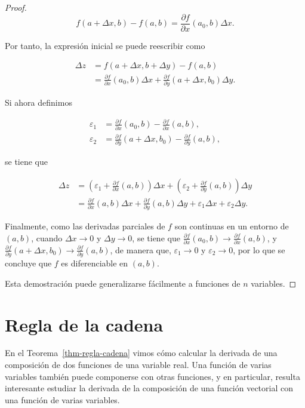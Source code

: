 \documentclass[
  a4paper,
]{scrreport}
\theoremstyle{plain}
\theoremstyle{definition}
\theoremstyle{plain}
\theoremstyle{plain}
\theoremstyle{definition}
\theoremstyle{definition}
\theoremstyle{remark}
\begin{document}
\begin{tcolorbox}
\begin{proof}
\[
f(a+\Delta x, b) - f(a,b) = \frac{\partial f}{\partial x}(a_0, b) \Delta x.
\]

Por tanto, la expresión inicial se puede reescribir como

\begin{align*}
\Delta z 
&= f(a+\Delta x, b+\Delta y) - f(a,b) \\
&= \frac{\partial f}{\partial x}(a_0, b) \Delta x + \frac{\partial f}{\partial y}(a+\Delta x, b_0) \Delta y.
\end{align*}

Si ahora definimos

\begin{align*}
\varepsilon_1 &= \frac{\partial f}{\partial x}(a_0,b)-\frac{\partial f}{\partial x}(a,b),\\
\varepsilon_2 &= \frac{\partial f}{\partial y}(a+\Delta x, b_0)-\frac{\partial f}{\partial y}(a,b),
\end{align*}

se tiene que

\begin{align*}
\Delta z 
&=
\left(\varepsilon_1 + \frac{\partial f}{\partial x}(a, b)\right)\Delta x + \left(\varepsilon_2 + \frac{\partial f}{\partial y}(a, b)\right)\Delta y \\
&= \frac{\partial f}{\partial x}(a, b)\Delta x + \frac{\partial f}{\partial y}(a, b)\Delta y + \varepsilon_1\Delta x + \varepsilon_2\Delta y.
\end{align*}

Finalmente, como las derivadas parciales de \(f\) son continuas en un
entorno de \((a,b)\), cuando \(\Delta x\to 0\) y \(\Delta y\to 0\), se
tiene que
\(\frac{\partial f}{\partial x}(a_0,b)\to \frac{\partial f}{\partial x}(a,b)\),
y
\(\frac{\partial f}{\partial y}(a+\Delta x, b_0)\to \frac{\partial f}{\partial y}(a,b)\),
de manera que, \(\varepsilon_1\to 0\) y \(\varepsilon_2\to 0\), por lo
que se concluye que \(f\) es diferenciable en \((a,b)\).

Esta demostración puede generalizarse fácilmente a funciones de \(n\)
variables.
\end{proof}

\end{tcolorbox}

\section{Regla de la cadena}\label{regla-de-la-cadena-2}

En el Teorema~\ref{thm-regla-cadena} vimos cómo calcular la derivada de
una composición de dos funciones de una variable real. Una función de
varias variables también puede componerse con otras funciones, y en
particular, resulta interesante estudiar la derivada de la composición
de una función vectorial con una función de varias variables.
\end{document}
